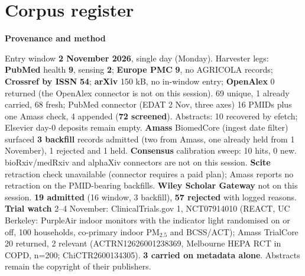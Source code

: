 \documentclass[10pt]{article}
\begin{document}
\clearpage
\section*{\sffamily\bfseries\color{Deep}Corpus register}
\vspace{-1.5mm}{\color{Amber}\rule{\linewidth}{1.1pt}}\vspace{2.5mm}



\vspace{2mm}

\begin{keybox}
{\sffamily\bfseries\footnotesize\color{Deep}Provenance and method}\\[1.2mm]
{\fontsize{7.2}{8.8}\selectfont
Entry window \textbf{2 November 2026}, single day (Monday). Harvester legs: \textbf{PubMed} health \textbf{9}, sensing \textbf{2}; \textbf{Europe PMC} \textbf{9}, no AGRICOLA records; \textbf{Crossref by ISSN} \textbf{54}; \textbf{arXiv} 150 kB, no in-window entry; \textbf{OpenAlex} 0 returned (the OpenAlex connector is not on this session). 69 unique, 1 already carried, 68 fresh; PubMed connector (EDAT 2 Nov, three axes) 16 PMIDs plus one Amass check, 4 appended (\textbf{72 screened}). Abstracts: 10 recovered by efetch; Elsevier day-0 deposits remain empty. \textbf{Amass} BiomedCore (ingest date filter) surfaced \textbf{3 backfill} records admitted (two from Amass, one already held from 1 November), 1 rejected and 1 held. \textbf{Consensus} calibration sweep: 10 hits, 0 new.
bioRxiv/medRxiv and alphaXiv connectors are not on this session. \textbf{Scite} retraction check unavailable (connector requires a paid plan); Amass reports no retraction on the PMID-bearing backfills. \textbf{Wiley Scholar Gateway} not on this session.
\textbf{19 admitted} (16 window, 3 backfill), \textbf{57 rejected} with logged reasons. \textbf{Trial watch} 2--4 November: ClinicalTrials.gov 1, NCT07914010 (REACT, UC Berkeley: PurpleAir indoor monitors with the indicator light randomised on or off, 100 households, co-primary indoor PM$_{2.5}$ and BCSS/ACT); Amass TrialCore 20 returned, 2 relevant (ACTRN12626001238369, Melbourne HEPA RCT in COPD, n=200; ChiCTR2600134305). \textbf{3 carried on metadata alone}.
Abstracts remain the copyright of their publishers.\par}
\end{keybox}
\end{document}
